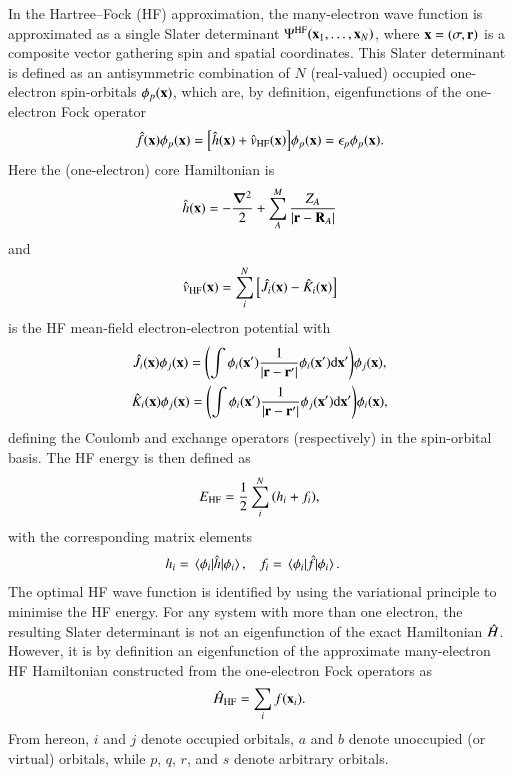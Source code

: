 \documentclass[aps,prb,reprint,noshowkeys,linenumbers,superscriptaddress]{revtex4-1}
\newcommand{\Ne}{N} %
\newcommand{\hH}{\Hat{H}}
\begin{document}
In the Hartree--Fock (HF) approximation, the many-electron wave function is approximated as a single Slater determinant $\Psi^{\text{HF}}(\vb{x}_1,\ldots,\vb{x}_N)$, where $\vb{x} = (\sigma,\vb{r})$ is a composite vector gathering spin and spatial coordinates.
This Slater determinant is defined as an antisymmetric combination of $\Ne$ (real-valued) occupied one-electron spin-orbitals $\phi_p(\vb{x})$, which are, by definition, eigenfunctions of the one-electron Fock operator 
\begin{equation}\label{eq:FockOp}
    \Hat{f}(\vb{x}) \phi_p(\vb{x}) = \qty[ \Hat{h}(\vb{x}) + \Hat{v}_\text{HF}(\vb{x}) ] \phi_p(\vb{x}) = \epsilon_p \phi_p(\vb{x}).
\end{equation}
Here the (one-electron) core Hamiltonian is
\begin{equation}
\label{eq:Hcore}
	\Hat{h}(\vb{x}) = -\frac{\grad^2}{2} + \sum_{A}^{M} \frac{Z_A}{\abs{\vb{r}-\vb{R}_A}}
\end{equation}
and
\begin{equation}
    \Hat{v}_\text{HF}(\vb{x}) = \sum_i^{N} \qty[ \Hat{J}_i(\vb{x}) - \Hat{K}_i(\vb{x}) ]
\end{equation}
is the HF mean-field electron-electron potential with 
\begin{subequations}
\begin{gather}
	\label{eq:CoulOp}
    \Hat{J}_i(\vb{x})\phi_j(\vb{x})=\qty(\int \phi_i(\vb{x}')\frac{1}{\abs{\vb{r} - \vb{r}'}}\phi_i(\vb{x}') \dd\vb{x}' ) \phi_j(\vb{x}),
	\\
	\label{eq:ExcOp}
\Hat{K}_i(\vb{x})\phi_j(\vb{x})=\qty(\int \phi_i(\vb{x}')\frac{1}{\abs{\vb{r} - \vb{r}'}}\phi_j(\vb{x}') \dd\vb{x}')\phi_i(\vb{x}),
\end{gather}
\end{subequations}
defining the Coulomb and exchange operators (respectively) in the spin-orbital basis.\cite{SzaboBook}
The HF energy is then defined as 
\begin{equation}
    \label{eq:E_HF}
    E_\text{HF} = \frac{1}{2} \sum_i^{N} \qty( h_i + f_i ),
\end{equation}
with the corresponding matrix elements
\begin{align}
	h_i & = \mel{\phi_i}{\Hat{h}}{\phi_i},
    & 
    f_i & = \mel{\phi_i}{\Hat{f}}{\phi_i}.
\end{align}
The optimal HF wave function is identified by using the variational principle to minimise the HF energy.
For any system with more than one electron, the resulting Slater determinant is not an eigenfunction of the exact Hamiltonian $\hH$. 
However, it is by definition an eigenfunction of the approximate many-electron HF Hamiltonian constructed 
from the one-electron Fock operators as
\begin{equation}\label{eq:HFHamiltonian}
	\hH_{\text{HF}} = \sum_{i} f(\vb{x}_i).
\end{equation}
From hereon, $i$ and $j$ denote occupied orbitals, $a$ and $b$ denote unoccupied (or virtual) orbitals, while $p$, $q$, $r$, and $s$ denote arbitrary orbitals.
\end{document}

